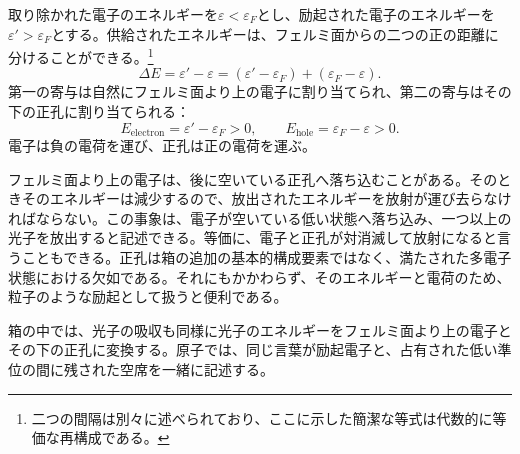 取り除かれた電子のエネルギーを\(\varepsilon<\varepsilon_F\)とし、励起された電子のエネルギーを\(\varepsilon'>\varepsilon_F\)とする。供給されたエネルギーは、フェルミ面からの二つの正の距離に分けることができる。\footnote{二つの間隔は別々に述べられており、ここに示した簡潔な等式は代数的に等価な再構成である。}
\begin{equation}
\Delta E
=\varepsilon'-\varepsilon
=(\varepsilon'-\varepsilon_F)+(\varepsilon_F-\varepsilon).
\end{equation}
第一の寄与は自然にフェルミ面より上の電子に割り当てられ、第二の寄与はその下の正孔に割り当てられる：
\begin{equation}
E_{\mathrm{electron}}=\varepsilon'-\varepsilon_F>0,
\qquad
E_{\mathrm{hole}}=\varepsilon_F-\varepsilon>0.
\end{equation}
電子は負の電荷を運び、正孔は正の電荷を運ぶ。

フェルミ面より上の電子は、後に空いている正孔へ落ち込むことがある。そのときそのエネルギーは減少するので、放出されたエネルギーを放射が運び去らなければならない。この事象は、電子が空いている低い状態へ落ち込み、一つ以上の光子を放出すると記述できる。等価に、電子と正孔が対消滅して放射になると言うこともできる。正孔は箱の追加の基本的構成要素ではなく、満たされた多電子状態における欠如である。それにもかかわらず、そのエネルギーと電荷のため、粒子のような励起として扱うと便利である。

\begin{classroomqa}
\end{classroomqa}

箱の中では、光子の吸収も同様に光子のエネルギーをフェルミ面より上の電子とその下の正孔に変換する。原子では、同じ言葉が励起電子と、占有された低い準位の間に残された空席を一緒に記述する。

\begin{classroomqa}
\end{classroomqa}

